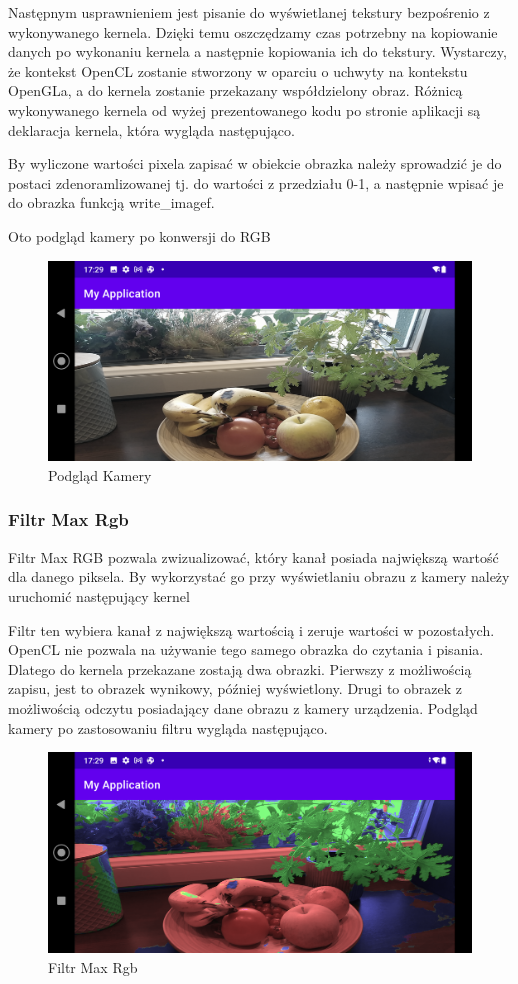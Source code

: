 Następnym usprawnieniem jest pisanie do wyświetlanej tekstury bezpośrenio z wykonywanego kernela. Dzięki temu oszczędzamy czas potrzebny na kopiowanie danych po wykonaniu kernela a następnie kopiowania ich do tekstury. Wystarczy, że kontekst OpenCL zostanie stworzony w oparciu o uchwyty na kontekstu OpenGLa, a do kernela zostanie przekazany współdzielony obraz. Różnicą wykonywanego kernela od wyżej prezentowanego kodu po stronie aplikacji są deklaracja kernela, która wygląda następująco.

By wyliczone wartości pixela zapisać w obiekcie obrazka należy sprowadzić je do postaci zdenoramlizowanej tj. do wartości z przedziału 0-1, a następnie wpisać je do obrazka funkcją write\_imagef.

Oto podgląd kamery po konwersji do RGB
\begin{figure}[H]
	\includegraphics[scale=0.16]{imgs/preview.png}
	\caption{Podgląd Kamery}
\end{figure}
\subsubsection[Filtr Max Rgb]{Filtr Max Rgb}
Filtr Max RGB pozwala zwizualizować, który kanał posiada największą wartość dla danego piksela. By wykorzystać go przy wyświetlaniu obrazu z kamery należy uruchomić następujący kernel

Filtr ten wybiera kanał z największą wartością i zeruje wartości w pozostałych. OpenCL nie pozwala na używanie tego samego obrazka do czytania i pisania. Dlatego do kernela przekazane zostają dwa obrazki. Pierwszy z możliwością zapisu, jest to obrazek wynikowy, później wyświetlony. Drugi to obrazek z możliwością odczytu posiadający dane obrazu z kamery urządzenia. Podgląd kamery po zastosowaniu filtru wygląda następująco.
\begin{figure}[H]
	\includegraphics[scale=0.16]{imgs/maxRgb.png}
	\caption{Filtr Max Rgb}
\end{figure}
